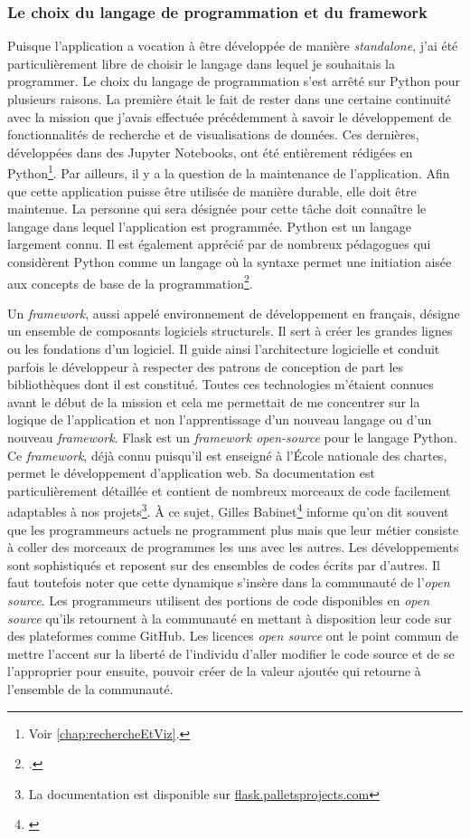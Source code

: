 \documentclass[a4paper, 12pt, twoside]{book}
\begin{document}
\subsubsection{Le choix du langage de programmation et du framework}
Puisque l'application a vocation à être développée de manière \textit{standalone}, j'ai été particulièrement libre de choisir le langage dans lequel je souhaitais la programmer. Le choix du langage de programmation s'est arrêté sur Python pour plusieurs raisons. La première était le fait de rester dans une certaine continuité avec la mission que j'avais effectuée précédemment à savoir le développement de fonctionnalités de recherche et de visualisations de données. Ces dernières, développées dans des Jupyter Notebooks, ont été entièrement rédigées en Python\footnote{Voir \autoref{chap:rechercheEtViz}.}. Par ailleurs, il y a la question de la maintenance de l'application. Afin que cette application puisse être utilisée de manière durable, elle doit être maintenue. La personne qui sera désignée pour cette tâche doit connaître le langage dans lequel l'application est programmée. Python est un langage largement connu. Il est également apprécié par de nombreux pédagogues qui considèrent Python comme un langage où la syntaxe permet une initiation aisée aux concepts de base de la programmation\footnote{\cite[préface]{elkner_how_nodate}.}. 

Un \textit{framework}, aussi appelé environnement de développement en français, désigne un ensemble de composants logiciels structurels. Il sert à créer les grandes lignes ou les fondations d'un logiciel. Il guide ainsi l'architecture logicielle et conduit parfois le développeur à respecter des patrons de conception de part les bibliothèques dont il est constitué. Toutes ces technologies m'étaient connues avant le début de la mission et cela me permettait de me concentrer sur la logique de l'application et non l'apprentissage d'un nouveau langage ou d'un nouveau \textit{framework}. Flask est un \textit{framework open-source} pour le langage Python. Ce \textit{framework}, déjà connu puisqu'il est enseigné à l'École nationale des chartes, permet le développement d'application web. Sa documentation est particulièrement détaillée et contient de nombreux morceaux de code facilement adaptables à nos projets\footnote{La documentation est disponible sur \href{https://flask.palletsprojects.com/en/2.0.x/}{flask.palletsprojects.com}}. À ce sujet, Gilles Babinet\footnote{\cite{babinet_12_2020}} informe qu'on dit souvent que les programmeurs actuels ne programment plus mais que leur métier consiste à coller des morceaux de programmes les uns avec les autres. Les développements sont sophistiqués et reposent sur des ensembles de codes écrits par d'autres. Il faut toutefois noter que cette dynamique s'insère dans la communauté de l'\textit{open source}. Les programmeurs utilisent des portions de code disponibles en \textit{open source} qu'ils retournent à la communauté en mettant à disposition leur code sur des plateformes comme GitHub. Les licences \textit{open source} ont le point commun de mettre l'accent sur la liberté de l'individu d'aller modifier le code source et de se l'approprier pour ensuite, pouvoir créer de la valeur ajoutée qui retourne à l'ensemble de la communauté.
\end{document}
